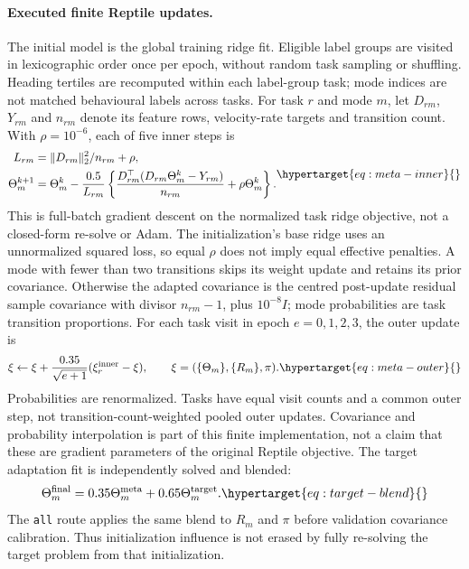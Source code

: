 \paragraph{Executed finite Reptile updates.}
The initial model is the global training ridge fit. Eligible label groups are
visited in lexicographic order once per epoch, without random task sampling
or shuffling. Heading tertiles are recomputed within each label-group task;
mode indices are not matched behavioural labels across tasks. For task
\(r\) and mode \(m\), let \(D_{rm}\), \(Y_{rm}\) and \(n_{rm}\) denote
its feature rows, velocity-rate targets and transition count. With
\(\rho=10^{-6}\), each of five inner steps is
\begin{equation}
 \begin{aligned}
 L_{rm}&=\|D_{rm}\|_2^2/n_{rm}+\rho,\\
 \Theta_m^{k+1}&=\Theta_m^k-\frac{0.5}{L_{rm}}
 \left\{\frac{D_{rm}^{\top}(D_{rm}\Theta_m^k-Y_{rm})}{n_{rm}}
                 +\rho\Theta_m^k\right\}.
 \end{aligned}
 \label{eq:meta-inner}\hypertarget{eq:meta-inner}{}
\end{equation}
This is full-batch gradient descent on the normalized task ridge objective,
not a closed-form re-solve or Adam. The initialization's base ridge uses
an unnormalized squared loss, so equal \(\rho\) does not imply equal
effective penalties. A mode with fewer than two transitions skips its
weight update and retains its prior covariance. Otherwise the adapted
covariance is the centred post-update residual sample covariance with divisor
\(n_{rm}-1\), plus \(10^{-8}I\); mode probabilities are task transition proportions.
For each task visit in epoch \(e=0,1,2,3\), the outer update is
\begin{equation}
 \xi\leftarrow\xi+\frac{0.35}{\sqrt{e+1}}(\xi_r^{\rm inner}-\xi),
 \qquad \xi=(\{\Theta_m\},\{R_m\},\pi).
 \label{eq:meta-outer}\hypertarget{eq:meta-outer}{}
\end{equation}
Probabilities are renormalized. Tasks have equal visit counts and a common
outer step, not transition-count-weighted pooled outer updates. Covariance
and probability interpolation is part of this finite implementation, not
a claim that these are gradient parameters of the original Reptile objective.
The target adaptation fit is independently solved and blended:
\begin{equation}
 \Theta_m^{\rm final}=0.35\Theta_m^{\rm meta}
                         +0.65\Theta_m^{\rm target}.
 \label{eq:target-blend}\hypertarget{eq:target-blend}{}
\end{equation}
The \texttt{all} route applies the same blend to \(R_m\) and \(\pi\)
before validation covariance calibration. Thus initialization influence is
not erased by fully re-solving the target problem from that initialization.

